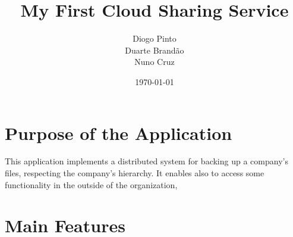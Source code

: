 \documentclass[a4paper]{article}
\title{My First Cloud Sharing Service}
\author{Diogo Pinto \\ Duarte Brandão \\ Nuno Cruz}
\date{\today}
\begin{document}
\maketitle

\section{Purpose of the Application}

This application implements a distributed system for backing up a company's files, respecting the company's hierarchy. 
It enables also to access some functionality in the outside of the organization, 

\section{Main Features}
\end{document}
